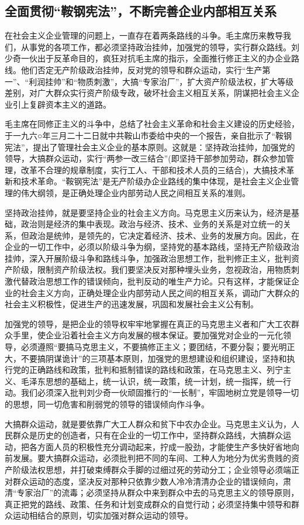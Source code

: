 \documentclass{book}
\begin{document}
\subsection{全面贯彻“鞍钢宪法”，不断完善企业内部相互关系}

在社会主义企业管理的问题上，一直存在着两条路线的斗争。毛主席历来教导我们，从事党的各项工作，都必须坚持政治挂帅，加强党的领导，实行群众路线。刘少奇一伙出于反革命目的，疯狂对抗毛主席的指示，全面推行修正主义的办企业路线。他们否定无产阶级政治挂帅，反对党的领导和群众运动，实行“生产第一”、“利润挂帅”和“物质刺激”，大搞“专家治厂”，扩大资产阶级法权，扩大等级差别，对广大群众实行资产阶级专政，破坏社会主义相互关系，阴谋把社会主义企业引上复辟资本主义的道路。

毛主席在同修正主义的斗争中，总结了社会主义革命和社会主义建设的历史经验，于一九六○年三月二十二日就中共鞍山市委给中央的一个报告，亲自批示了“鞍钢宪法”，提出了管理社会主义企业的基本原则。这就是：坚持政治挂帅，加强党的领导，大搞群众运动，实行“两参一改三结合”(即坚持干部参加劳动，群众参加管理，改革不合理的规章制度，实行工人、干部和技术人员的三结合)，大搞技术革新和技术革命。“鞍钢宪法”是无产阶级办企业路线的集中体现，是社会主义企业管理的伟大纲领，是正确处理企业内部劳动人民之间相互关系的准则。

坚持政治挂帅，就是要坚持企业的社会主义方向。马克思主义历来认为，经济是基础，政治则是经济的集中表现。政治与经济、技术、业务的关系是对立统一的关系，但政治是统帅，是领先的，它决定着经济、技术、业务的发展方向。因此，在企业的一切工作中，必须以阶级斗争为纲，坚持党的基本路线，坚持无产阶级政治挂帅，深入开展阶级斗争和路线斗争，加强政治思想工作，批判修正主义，批判资产阶级，限制资产阶级法权。我们要坚决反对那种埋头业务，忽视政治，用物质刺激代替政治思想工作的错误倾向，批判反动的唯生产力论。只有这样，才能保证企业的社会主义方向，正确处理企业内部劳动人民之间的相互关系，调动广大群众的社会主义积极性，促进生产的迅速发展，巩固和发展社会主义公有制。

加强党的领导，是把企业的领导权牢牢地掌握在真正的马克思主义者和广大工农群众手里，使企业沿着社会主义方向发展的根本保证。要加强党对企业的一元化领导，必须遵照“要搞马克思主义，不要搞修正主义；要团结，不要分裂；要光明正大，不要搞阴谋诡计”的三项基本原则，加强党的思想建设和组织建设，坚持和执行党的正确路线和政策，批判和抵制错误的路线和政策，在马克思主义、列宁主义、毛泽东思想的基础上，统一认识，统一政策，统一计划，统一指挥，统一行动。我们必须深入批判刘少奇一伙顽固推行的“一长制”，牢固地树立党是领导一切的思想，同一切危害和削弱党的领导的错误倾向作斗争。

大搞群众运动，就是要依靠广大工人群众和贫下中农办企业。马克思主义认为，人民群众是历史的创造者，只有在企业的一切工作中，坚持群众路线，大搞群众运动，把各方面人员的积极性充分调动起来，拧成一股劲，才能使生产多快好省地向前发展。要大搞群众运动，必须批判把不同的车间、工种人为地分为优劣贵贱的资产阶级法权思想，并打破束缚群众手脚的过细过死的劳动分工；企业领导必须端正对群众运动的态度，坚决反对那种只依靠少数人冷冷清清办企业的错误倾向，肃清“专家治厂”的流毒；必须坚持从群众中来到群众中去的马克思主义的领导原则，真正把党的路线、政策、任务和计划变成群众的自觉行动；必须坚持集中领导和群众运动相结合的原则，切实加强对群众运动的领导。
\end{document}
